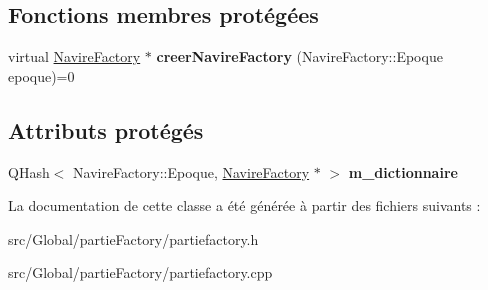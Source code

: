 \subsection*{Fonctions membres protégées}
\begin{DoxyCompactItemize}
\item 
virtual \hyperlink{class_navire_factory}{Navire\+Factory} $\ast$ {\bfseries creer\+Navire\+Factory} (Navire\+Factory\+::\+Epoque epoque)=0\hypertarget{class_partie_factory_a4ca8f93c010bfd48cef57e9b2ee7a1a1}{}\label{class_partie_factory_a4ca8f93c010bfd48cef57e9b2ee7a1a1}

\end{DoxyCompactItemize}
\subsection*{Attributs protégés}
\begin{DoxyCompactItemize}
\item 
Q\+Hash$<$ Navire\+Factory\+::\+Epoque, \hyperlink{class_navire_factory}{Navire\+Factory} $\ast$ $>$ {\bfseries m\+\_\+dictionnaire}\hypertarget{class_partie_factory_afe72400900dedead78486633a6ad6b08}{}\label{class_partie_factory_afe72400900dedead78486633a6ad6b08}

\end{DoxyCompactItemize}


La documentation de cette classe a été générée à partir des fichiers suivants \+:\begin{DoxyCompactItemize}
\item 
src/\+Global/partie\+Factory/partiefactory.\+h\item 
src/\+Global/partie\+Factory/partiefactory.\+cpp\end{DoxyCompactItemize}
